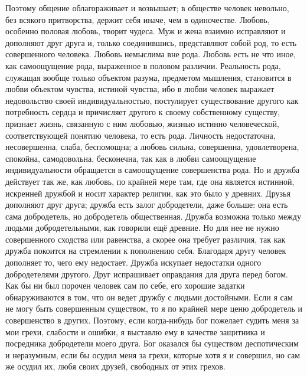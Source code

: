 \documentclass[12pt,oneside]{book}
\begin{document}
Поэтому общение облагораживает и возвышает; в обществе человек невольно, без всякого притворства, держит себя иначе, чем в одиночестве. Любовь, особенно половая любовь, творит чудеса. Муж и жена взаимно исправляют и дополняют друг друга и, только соединившись, представляют собой род, то есть совершенного человека\ddag\let\svthefootnote\thefootnote\let\thefootnote\relax{}\let\thefootnote\svthefootnote. Любовь немыслима вне рода. Любовь есть не что иное, как самоощущение рода, выраженное в половом различии. Реальность рода, служащая вообще только объектом разума, предметом мышления, становится в любви объектом чувства, истиной чувства, ибо в любви человек выражает недовольство своей индивидуальностью, постулирует существование другого как потребность сердца и причисляет другого к своему собственному существу, признает жизнь, связанную с ним любовью, жизнью истинно человеческой, соответствующей понятию человека, то есть рода. Личность недостаточна, несовершенна, слаба, беспомощна; а любовь сильна, совершенна, удовлетворена, спокойна, самодовольна, бесконечна, так как в любви самоощущение индивидуальности обращается в самоощущение совершенства рода. Но и дружба действует так же, как любовь, по крайней мере там, где она является истинной, искренней дружбой и носит характер религии, как это было у древних. Друзья дополняют друг друга; дружба есть залог добродетели, даже больше: она есть сама добродетель, но добродетель общественная. Дружба возможна только между людьми добродетельными, как говорили ещё древние. Но для нее не нужно совершенного сходства или равенства, а скорее она требует различия, так как дружба покоится на стремлении к пополнению себя. Благодаря другу человек дополняет то, чего ему недостает. Дружба искупает недостатки одного добродетелями другого. Друг испрашивает оправдания для друга перед богом. Как бы ни был порочен человек сам по себе, его хорошие задатки обнаруживаются в том, что он ведет дружбу с людьми достойными. Если я сам не могу быть совершенным существом, то я по крайней мере ценю добродетель и совершенство в других. Поэтому, если когда-нибудь бог пожелает судить меня за мои грехи, слабости и ошибки, я выставлю ему в качестве защитника и посредника добродетели моего друга. Бог оказался бы существом деспотическим и неразумным, если бы осудил меня за грехи, которые хотя я и совершил, но сам же осудил их, любя своих друзей, свободных от этих грехов.
\end{document}
